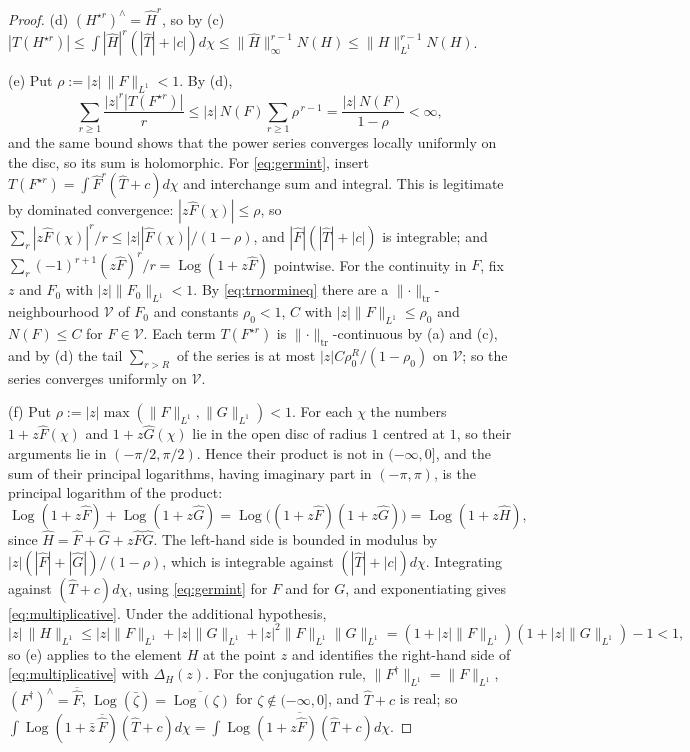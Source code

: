 \documentclass[11pt]{amsart}
\theoremstyle{definition}
\theoremstyle{remark}
\newcommand{\Th}{\widehat{T}}
\begin{document}
\begin{proof}
(d)  $(H^{\star r})^{\wedge}=\widehat H^{r}$, so by (c)
$|T(H^{\star r})|\le\int|\widehat H|^{r}(|\Th|+|c|)d\chi\le
\lVert\widehat H\rVert_{\infty}^{r-1}N(H)\le\lVert H\rVert_{L^{1}}^{r-1}N(H)$.

(e)  Put $\rho:=|z|\,\lVert F\rVert_{L^{1}}<1$.  By (d),
\[
\sum_{r\ge1}\frac{|z|^{r}|T(F^{\star r})|}{r}\le|z|\,N(F)\sum_{r\ge1}
\rho^{\,r-1}=\frac{|z|\,N(F)}{1-\rho}<\infty ,
\]
and the same bound shows that the power series converges locally uniformly on
the disc, so its sum is holomorphic.  For \eqref{eq:germint}, insert
$T(F^{\star r})=\int\widehat F^{r}(\Th+c)d\chi$ and interchange sum and
integral.  This is legitimate by dominated convergence:
$|z\widehat F(\chi)|\le\rho$, so
$\sum_r|z\widehat F(\chi)|^{r}/r\le|z||\widehat F(\chi)|/(1-\rho)$, and
$|\widehat F|(|\Th|+|c|)$ is integrable; and
$\sum_r(-1)^{r+1}(z\widehat F)^{r}/r=\operatorname{Log}(1+z\widehat F)$ pointwise.  For the
continuity in $F$, fix $z$ and $F_0$ with $|z|\lVert F_0\rVert_{L^{1}}<1$.  By
\eqref{eq:trnormineq} there are a
$\lVert\cdot\rVert_{\mathrm{tr}}$-neighbourhood $\mathcal V$ of $F_0$ and constants
$\rho_0<1$, $C$ with $|z|\lVert F\rVert_{L^{1}}\le\rho_0$ and $N(F)\le C$ for
$F\in\mathcal V$.  Each term $T(F^{\star r})$ is
$\lVert\cdot\rVert_{\mathrm{tr}}$-continuous by (a) and (c), and by (d) the
tail $\sum_{r>R}$ of the series is at most $|z|C\rho_0^{R}/(1-\rho_0)$ on
$\mathcal V$; so the series converges uniformly on $\mathcal V$.

(f)  Put $\rho:=|z|\max(\lVert F\rVert_{L^{1}},\lVert G\rVert_{L^{1}})<1$.
For each $\chi$ the numbers $1+z\widehat F(\chi)$ and $1+z\widehat G(\chi)$ lie
in the open disc of radius $1$ centred at $1$, so their arguments lie in
$(-\pi/2,\pi/2)$.  Hence their product is not in $(-\infty,0]$, and the sum
of their principal logarithms, having imaginary part in $(-\pi,\pi)$, is the
principal logarithm of the product:
\[
\operatorname{Log}(1+z\widehat F)+\operatorname{Log}(1+z\widehat G)
=\operatorname{Log}\bigl((1+z\widehat F)(1+z\widehat G)\bigr)=\operatorname{Log}(1+z\widehat H),
\]
since $\widehat H=\widehat F+\widehat G+z\widehat F\widehat G$.  The left-hand
side is bounded in modulus by $|z|(|\widehat F|+|\widehat G|)/(1-\rho)$, which
is integrable against $(|\Th|+|c|)d\chi$.  Integrating against
$(\Th+c)d\chi$, using \eqref{eq:germint} for $F$ and for $G$, and
exponentiating gives \eqref{eq:multiplicative}.  Under the additional
hypothesis,
\[
|z|\,\lVert H\rVert_{L^{1}}\le|z|\lVert F\rVert_{L^{1}}+|z|\lVert
G\rVert_{L^{1}}+|z|^{2}\lVert F\rVert_{L^{1}}\lVert G\rVert_{L^{1}}
=(1+|z|\lVert F\rVert_{L^{1}})(1+|z|\lVert G\rVert_{L^{1}})-1<1 ,
\]
so (e) applies to the element $H$ at the point $z$ and identifies the
right-hand side of \eqref{eq:multiplicative} with $\Delta_H(z)$.  For the
conjugation rule, $\lVert F^{\dagger}\rVert_{L^{1}}=\lVert F\rVert_{L^{1}}$,
$(F^{\dagger})^{\wedge}=\overline{\widehat F}$,
$\operatorname{Log}(\bar\zeta)=\overline{\operatorname{Log}(\zeta)}$ for $\zeta\notin(-\infty,0]$, and
$\Th+c$ is real; so
$\int\operatorname{Log}(1+\bar z\,\overline{\widehat F})(\Th+c)d\chi=
\overline{\int\operatorname{Log}(1+z\widehat F)(\Th+c)d\chi}$.
\end{proof}
\end{document}
